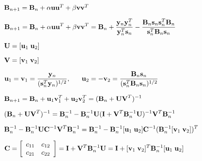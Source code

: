\documentclass{article}
\def\lthtmlcheckvsize{\ifdim\ht\sizebox<\vsize 
  \ifdim\wd\sizebox<\hsize\expandafter\hfill\fi \expandafter\vfill
  \else\expandafter\vss\fi}%
\begin{document}
{\newpage\clearpage
{}%
$ {\bf B}_{n+1}={\bf B}_n+\alpha{\bf uu}^T+\beta{\bf vv}^T$%
\lthtmlindisplaymathZ
\lthtmlcheckvsize\clearpage}

{\newpage\clearpage
{}%
$\displaystyle {\bf B}_{n+1}={\bf B}_n+\alpha{\bf uu}^T+\beta{\bf vv}^T
={\bf B}_n+\frac{{\bf y}_n{\bf y}_n^T}{{\bf y}_n^T{\bf s}_n}
-\frac{{\bf B}_n{\bf s}_n{\bf s}_n^T{\bf B}_n}{{\bf s}_n^T{\bf B}_n{\bf s}_n}$%
\lthtmlindisplaymathZ
\lthtmlcheckvsize\clearpage}

{\newpage\clearpage
{}%
$ {\bf U}=[{\bf u}_1\;{\bf u}_2]$%
\lthtmlindisplaymathZ
\lthtmlcheckvsize\clearpage}

{\newpage\clearpage
{}%
$ {\bf V}=[{\bf v}_1\;{\bf v}_2]$%
\lthtmlindisplaymathZ
\lthtmlcheckvsize\clearpage}

{\newpage\clearpage
{}%
$\displaystyle {\bf u}_1={\bf v}_1=\frac{{\bf y}_n}{({\bf s}_n^T{\bf y}_n)^{1/2}},
\;\;\;\;\;\;
{\bf u}_2=-{\bf v}_2=\frac{{\bf B}_n{\bf s}_n}{({\bf s}_n^T{\bf B}_n{\bf s}_n)^{1/2}}$%
\lthtmlindisplaymathZ
\lthtmlcheckvsize\clearpage}

{\newpage\clearpage
{}%
$\displaystyle {\bf B}_{n+1}={\bf B}_n+{\bf u}_1{\bf v}_1^T+{\bf u}_2{\bf v}_2^T
=({\bf B}_n+{\bf UV}^T)^{-1}$%
\lthtmlindisplaymathZ
\lthtmlcheckvsize\clearpage}

{\newpage\clearpage
{}%
$\displaystyle ({\bf B}_n+{\bf UV}^T)^{-1}
={\bf B}_n^{-1}-{\bf B}_n^{-1}{\bf U}({\bf I}+{\bf V}^T{\bf B}_n^{-1}{\bf U})^{-1}{\bf V}^T{\bf B}_n^{-1}$%
\lthtmlindisplaymathZ
\lthtmlcheckvsize\clearpage}

{\newpage\clearpage
{}%
$\displaystyle {\bf B}_n^{-1}-{\bf B}_n^{-1}{\bf U}{\bf C}^{-1}{\bf V}^T{\bf B}_n^{-1}
={\bf B}_n^{-1}-{\bf B}_n^{-1}[{\bf u}_1\;{\bf u}_2]{\bf C}^{-1}
({\bf B}_n^{-1}[{\bf v}_1\;{\bf v}_2])^T$%
\lthtmlindisplaymathZ
\lthtmlcheckvsize\clearpage}

{\newpage\clearpage
{}%
$\displaystyle {\bf C}=\left[\begin{array}{cc}c_{11} & c_{12}\\c_{21} & c_{22}\end{array}\right]
={\bf I}+{\bf V}^T{\bf B}_n^{-1}{\bf U}
={\bf I}+[{\bf v}_1\;{\bf v}_2]^T{\bf B}^{-1}_n[{\bf u}_1\;{\bf u}_2]$%
\lthtmlindisplaymathZ
\lthtmlcheckvsize\clearpage}
\end{document}
